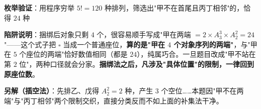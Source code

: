 \begin{answer}
\textbf{枚举验证}：用程序穷举 $5!=120$ 种排列，筛选出"甲不在首尾且丙丁相邻"的，恰得 $24$ 种 

\begin{gktip}
\textbf{陷阱说明}：捆绑后对象只剩 $4$ 个，很容易顺手写成"甲在两端 $=2\times A_3^3\times A_2^2=24$"——这个式子把 $\square$ 当成一个普通座位，\textbf{算的是"甲在 $4$ 个对象序列的两端"}，与"甲在 $5$ 个座位的两端"恰好数值相同（都是 $24$），纯属巧合。一旦题目改成"甲不站在第 $2$ 位"，两种口径就会分家。\textbf{捆绑法之后，凡涉及"具体位置"的限制，一律回到原座位数}。

\textbf{另解（插空法）}：先排乙、戊得 $A_2^2=2$ 种，产生 $3$ 个空位……本题因"甲不在两端"与"丙丁相邻"两个限制交织，直接分类反而不如上面的补集法干净。
\end{gktip}


\par\medskip

\end{answer}
